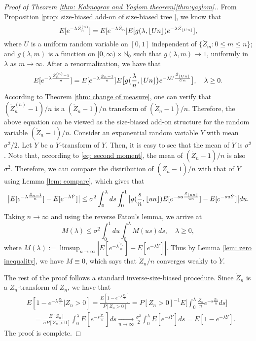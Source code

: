 \documentclass[12pt,a4paper]{amsart}
\DeclarePairedDelimiter\floor{\lfloor}{\rfloor}
\numberwithin{equation}{section}
\begin{document}
\begin{proof}[Proof of Theorem \ref{thm: Kolmogrov and Yaglom theorem}\eqref{thm:yaglom}.]
	From Proposition \ref{prop: size-biased add-on of size-biased tree }, we know that
	\[
	E [ e^{- \lambda \ddot Z_n^{(n)}} ]
		= E [e^{-\lambda \dot Z_n}] E[g(\lambda, \floor{Un})e^{-\lambda \dot Z_{\floor{Un}}}],
	\]
	where $U$ is a uniform  random variable on $[0,1]$ independent of $\{\dot Z_m: 0\le m\le n\}$;
	and $g(\lambda, m)$ is a function on $[0,\infty) \times \mathbb N_0$ such that
	$g(\lambda, m) \to 1$, uniformly in $\lambda$ as $m\to \infty$.
	After a renormalization, we have that
\begin{equation}\label{eq: renormalized size-biased add-on equation}
	E [ e^{- \lambda \frac{\ddot Z_n^{(n)}-1}{n}} ]
	= E [e^{-\lambda \frac{\dot Z_n - 1}{n}}] E\big[g\big(\frac{\lambda}{n}, \floor{Un} \big)e^{-\lambda U \frac{\dot Z_{\floor{Un}}}{Un} }\big],
	\quad \lambda \geq 0.
\end{equation}
	According to Theorem \ref{thm: change of measure}, one can verify that 
	$(\ddot Z_n^{(n)} - 1)/n$ is a $(\dot Z_n - 1)/n$ transform of $(\dot Z_n - 1)/n$.
	Therefore, the above equation can be viewed as the size-biased add-on structure for the random variable $(\dot Z_n - 1)/n$.
	Consider an exponential random variable $Y$ with mean $\sigma^2/2$.
	Let $\dot Y$ be a $Y$-transform of $Y$.
Then, it is easy to see that the mean of $\dot Y$ is $\sigma^2$.
	Note that, according to \eqref{eq: second moment}, the mean of $(\dot Z_n - 1)/n$ is also $\sigma^2$.
	Therefore, we can compare the distribution of $(\dot Z_n - 1)/n$ 
	with that of $\dot Y$ using Lemma \ref{lem: compare}, which gives that
\[
	\big| E[e^{-\lambda \frac{\dot Z_n - 1}{n}}] - E[e^{-\lambda \dot Y}]\big|
	\leq \sigma^2 \int_0^\lambda ds \int_0^1 \big| g(\frac{s}{n}, \floor{un}) E[e^{-su \frac { Z_{\floor{un}} } {un} }] - E[e^{- su \dot Y}]\big| du.
\]
Taking $n\to \infty$ and using the reverse Fatou's lemma, we arrive at
\[
	M(\lambda)
	\leq \sigma^2 \int_0^1du \int_0^\lambda M(us)ds,
	\quad \lambda\geq 0,
\]
	where
$M(\lambda) := \limsup_{n\to \infty} | E[ e^{- \lambda \frac{\dot Z_n }{n}}] - E[e^{-\lambda \dot Y}]|$.
	Thus by Lemma \ref{lem: zero inequality}, we have $M \equiv 0$, which says that $\dot Z_n/n$ converges weakly to $\dot Y$.

	The rest of the proof follows a standard inverse-size-biased procedure.
	Since $\dot Z_n$ is a $Z_n$-transform of $Z_n$, we have that
	\[\begin{split}
	&E[1-e^{-\lambda \frac{Z_n}{n}} | Z_n > 0]
	= \frac{E[1- e^{-\lambda \frac{Z_n}{n}}]}{P[Z_n > 0]}
	= P[Z_n > 0]^{-1} E \Big[\int_0^\lambda \frac{Z_n}{n}e^{- s \frac{Z_n}{n}} ds\Big]
	\\&\quad = \frac{E[Z_n]}{nP[Z_n > 0]}\int_0^\lambda E [e^{- s \frac{\dot Z_n}{n}}] ds
	\xrightarrow[n\to \infty]{} \frac{\sigma^2}{2} \int_0^\lambda E[e^{-s \dot Y}]ds
	= E[1-e^{-\lambda Y}].
	\end{split}\]
	The proof is complete.
\end{proof}
\end{document}
